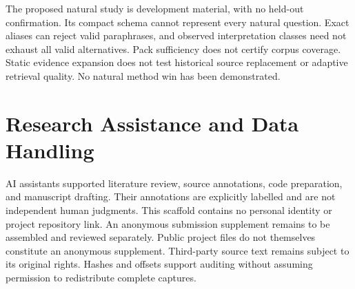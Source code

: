 \documentclass[11pt]{article}
\begin{document}
The proposed natural study is development material, with no held-out confirmation.
Its compact schema cannot represent every natural question.
Exact aliases can reject valid paraphrases, and observed interpretation classes need not exhaust all valid alternatives.
Pack sufficiency does not certify corpus coverage.
Static evidence expansion does not test historical source replacement or adaptive retrieval quality.
No natural method win has been demonstrated.

\section*{Research Assistance and Data Handling}

AI assistants supported literature review, source annotations, code preparation, and manuscript drafting.
Their annotations are explicitly labelled and are not independent human judgments.
This scaffold contains no personal identity or project repository link.
An anonymous submission supplement remains to be assembled and reviewed separately.
Public project files do not themselves constitute an anonymous supplement.
Third-party source text remains subject to its original rights.
Hashes and offsets support auditing without assuming permission to redistribute complete captures.


\end{document}
